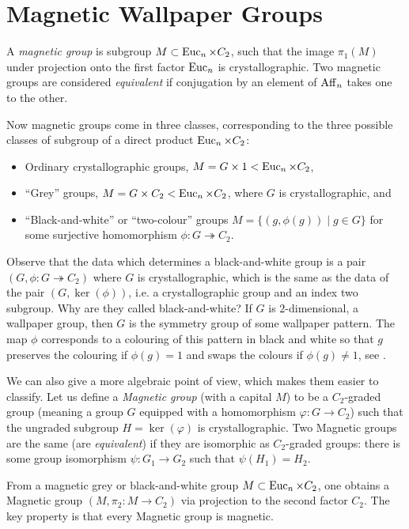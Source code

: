 \section{Magnetic Wallpaper Groups} \label{sect:are_there}

A \emph{magnetic group} is subgroup $M \subset \operatorname{Euc}_n \times C_2$, such that the image $\pi_1(M)$ under projection onto the first factor $\operatorname{Euc}_n$ is crystallographic. Two magnetic groups are considered \emph{equivalent} if conjugation by an element of $\operatorname{Aff}_n$ %
takes one to the other.


Now magnetic groups come in three classes, corresponding to the three possible classes of subgroup of a direct product $\operatorname{Euc}_n \times C_2$:
\begin{itemize}
  \item Ordinary crystallographic groups, $M = G \times 1 < \operatorname{Euc}_n \times C_2$,
  \item ``Grey'' groups, $M = G \times C_2 < \operatorname{Euc}_n \times C_2$, where $G$ is crystallographic, and
  \item ``Black-and-white'' or ``two-colour'' groups
    $M = \{(g, \phi(g)) \mid g \in G\}$
  for some surjective homomorphism $\phi \colon G \twoheadrightarrow C_2$.
\end{itemize} 


Observe that the data which determines a black-and-white group is a pair $(G, \phi \colon G \twoheadrightarrow C_2)$ where $G$ is crystallographic, which is the same as the data of the pair $(G,\ker(\phi))$, i.e. a crystallographic group and an index two subgroup. Why are they called black-and-white? If $G$ is $2$-dimensional, a wallpaper group, then $G$ is the symmetry group of some wallpaper pattern. The map $\phi$ corresponds to a colouring of this pattern in black and white so that $g$ preserves the colouring if $\phi(g) = 1$ and swaps the colours if $\phi(g) \neq 1$, see \cite{Schat}.

We can also give a more algebraic point of view, which makes them easier to classify. Let us define a \emph{Magnetic group} (with a capital $M$) to be a $C_2$-graded group (meaning a group $G$ equipped with a homomorphism $\varphi \colon G \rightarrow C_2$) such that the ungraded subgroup $H = \ker(\varphi)$ is crystallographic. Two Magnetic groups are the same (are \emph{equivalent}) if they are isomorphic as $C_2$-graded groups: there is some group isomorphism $\psi \colon G_1 \rightarrow G_2$ such that $\psi(H_1) = H_2$.

From a magnetic grey or black-and-white group $M \subset \operatorname{Euc}_n \times C_2$, one obtains a Magnetic group $(M, \pi_2 \colon M \rightarrow C_2)$ via projection to the second factor $C_2$. The key property is that every Magnetic group is magnetic.

